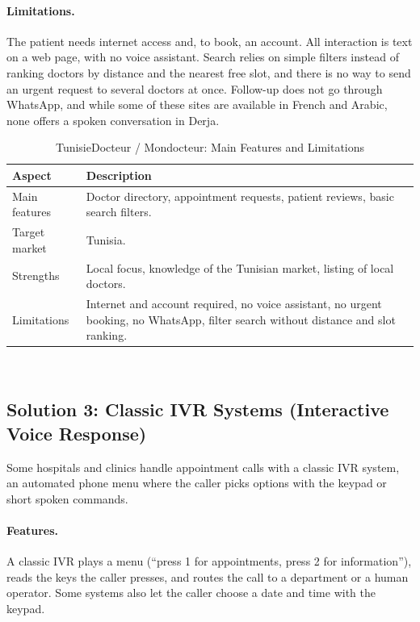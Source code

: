 \paragraph{Limitations.} The patient needs internet access and, to book, an account. All interaction is text on a web page, with no voice assistant. Search relies on simple filters instead of ranking doctors by distance and the nearest free slot, and there is no way to send an urgent request to several doctors at once. Follow-up does not go through WhatsApp, and while some of these sites are available in French and Arabic, none offers a spoken conversation in Derja.

\begin{table}[H]
    \centering
    \caption{TunisieDocteur / Mondocteur: Main Features and Limitations}
    \label{tab:tunisiedoctor}
    \small
    \begin{tabular}{>{\raggedright\arraybackslash}p{\dimexpr 0.3571\dimexpr\textwidth-4\tabcolsep\relax\relax}>{\raggedright\arraybackslash}p{\dimexpr 0.6429\dimexpr\textwidth-4\tabcolsep\relax\relax}}
        \toprule
        \textbf{Aspect} & \textbf{Description} \\
        \midrule
        Main features & Doctor directory, appointment requests, patient reviews, basic search filters. \\
        Target market & Tunisia. \\
        Strengths & Local focus, knowledge of the Tunisian market, listing of local doctors. \\
        Limitations & Internet and account required, no voice assistant, no urgent booking, no WhatsApp, filter search without distance and slot ranking. \\
        \bottomrule
    \end{tabular}
    \\[0.2cm]
\end{table}

\subsection{Solution 3: Classic IVR Systems (Interactive Voice Response)}
Some hospitals and clinics handle appointment calls with a classic IVR system, an automated phone menu where the caller picks options with the keypad or short spoken commands.

\paragraph{Features.} A classic IVR plays a menu (``press 1 for appointments, press 2 for information''), reads the keys the caller presses, and routes the call to a department or a human operator. Some systems also let the caller choose a date and time with the keypad.

